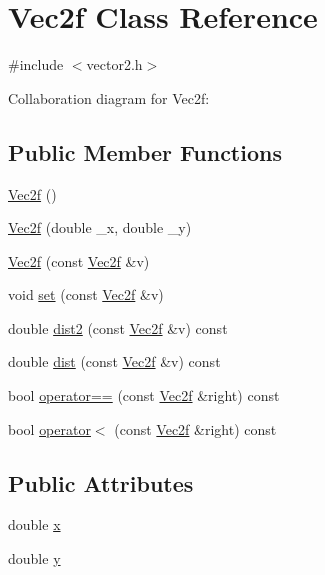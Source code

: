 \hypertarget{class_vec2f}{}\section{Vec2f Class Reference}
\label{class_vec2f}


{\ttfamily \#include $<$vector2.\+h$>$}



Collaboration diagram for Vec2f\+:
\subsection*{Public Member Functions}
\begin{DoxyCompactItemize}
\item 
\hyperlink{class_vec2f_a3582875fbf3badc6af02646e07bcf440}{Vec2f} ()
\item 
\hyperlink{class_vec2f_a3ce4919fdf7137dd1536b68f4aae53fb}{Vec2f} (double \+\_\+x, double \+\_\+y)
\item 
\hyperlink{class_vec2f_a3a41f568a8852d55f8d4989af776b798}{Vec2f} (const \hyperlink{class_vec2f}{Vec2f} \&v)
\item 
void \hyperlink{class_vec2f_a23721913973d2f6cbd337cf7355274e1}{set} (const \hyperlink{class_vec2f}{Vec2f} \&v)
\item 
double \hyperlink{class_vec2f_a9d8ee61baed27654281edb0bea4f022a}{dist2} (const \hyperlink{class_vec2f}{Vec2f} \&v) const 
\item 
double \hyperlink{class_vec2f_a648c71905bbd4376be6ffe729ab9a4e0}{dist} (const \hyperlink{class_vec2f}{Vec2f} \&v) const 
\item 
bool \hyperlink{class_vec2f_afb67dd49ed0ff76dbf4c4bd5344e2b59}{operator==} (const \hyperlink{class_vec2f}{Vec2f} \&right) const 
\item 
bool \hyperlink{class_vec2f_a32bddb3312af7d2158235c8bbb886324}{operator$<$} (const \hyperlink{class_vec2f}{Vec2f} \&right) const 
\end{DoxyCompactItemize}
\subsection*{Public Attributes}
\begin{DoxyCompactItemize}
\item 
double \hyperlink{class_vec2f_aae649f38fb692202ed76dd1783c02d1f}{x}
\item 
double \hyperlink{class_vec2f_a6215e122ad762df0beb90949f8e1859a}{y}
\end{DoxyCompactItemize}
